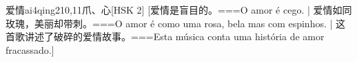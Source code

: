 \begin{EntryWithPhonetic}{爱情}{ai4qing2}{10,11}{⽖、⼼}[HSK 2]
  [爱情是盲目的。===O amor é cego. | 爱情如同玫瑰，美丽却带刺。===O amor é como uma rosa, bela mas com espinhos.  | 这首歌讲述了破碎的爱情故事。===Esta música conta uma história de amor fracassado.]
\end{EntryWithPhonetic}

